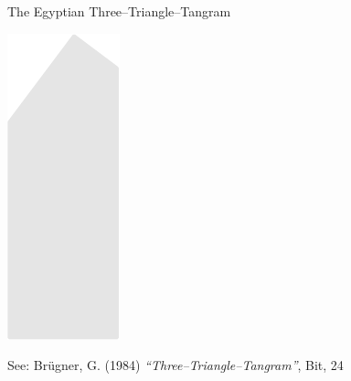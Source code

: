 \documentclass[14pt]{beamer}
\begin{document}
\begin{frame}{The Egyptian Three--Triangle--Tangram}
\begin{center}
            \includegraphics[scale=0.39]{figures/figure004k.pdf}\\

            \bigskip\medskip

            {\footnotesize See: Brügner, G. (1984) \emph{``Three--Triangle--Tangram''}, Bit, 24}
        \end{center}
    \end{frame}

\end{document}
